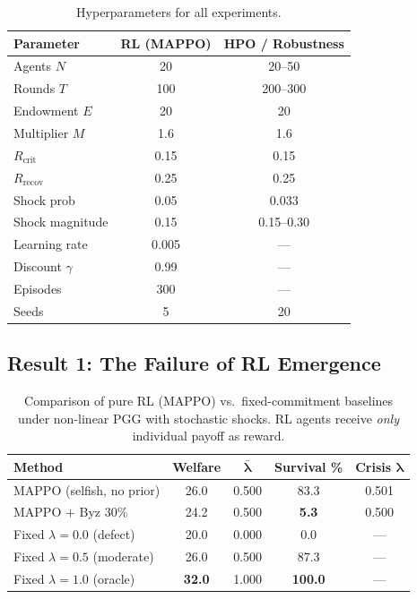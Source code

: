 \documentclass{article}
\begin{document}
\begin{table}[h]
\centering
\caption{Hyperparameters for all experiments.}
\label{tab:hyperparams}
\begin{tabular}{lcc}
\toprule
\textbf{Parameter} & \textbf{RL (MAPPO)} & \textbf{HPO / Robustness} \\
\midrule
Agents $N$ & 20 & 20--50 \\
Rounds $T$ & 100 & 200--300 \\
Endowment $E$ & 20 & 20 \\
Multiplier $M$ & 1.6 & 1.6 \\
$R_{\text{crit}}$ & 0.15 & 0.15 \\
$R_{\text{recov}}$ & 0.25 & 0.25 \\
Shock prob & 0.05 & 0.033 \\
Shock magnitude & 0.15 & 0.15--0.30 \\
Learning rate & 0.005 & --- \\
Discount $\gamma$ & 0.99 & --- \\
Episodes & 300 & --- \\
Seeds & 5 & 20 \\
\bottomrule
\end{tabular}
\end{table}

\subsection{Result 1: The Failure of RL Emergence}
\label{sec:emergence}

\begin{table}[t]
\centering
\caption{Comparison of pure RL (MAPPO) vs.\ fixed-commitment baselines under non-linear PGG with stochastic shocks. RL agents receive \emph{only} individual payoff as reward.}
\label{tab:emergence}
\begin{tabular}{lcccc}
\toprule
\textbf{Method} & \textbf{Welfare} & $\boldsymbol{\bar{\lambda}}$ & \textbf{Survival \%} & \textbf{Crisis $\boldsymbol{\lambda}$} \\
\midrule
MAPPO (selfish, no prior) & 26.0 & 0.500 & 83.3 & 0.501 \\
MAPPO + Byz 30\% & 24.2 & 0.500 & \textbf{5.3} & 0.500 \\
\midrule
Fixed $\lambda=0.0$ (defect) & 20.0 & 0.000 & 0.0 & --- \\
Fixed $\lambda=0.5$ (moderate) & 26.0 & 0.500 & 87.3 & --- \\
Fixed $\lambda=1.0$ (oracle) & \textbf{32.0} & 1.000 & \textbf{100.0} & --- \\
\bottomrule
\end{tabular}
\end{table}
\end{document}

